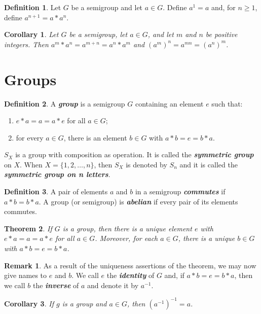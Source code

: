 \documentclass[12pt]{report}
\newtheorem{theorem}{Theorem}[chapter]
\newtheorem{corollary}[theorem]{Corollary}
\theoremstyle{definition}
\newtheorem*{definition}{Definition}
\newtheorem*{remark}{Remark}
\newcommand{\term}[1]{\textbf{\textit{#1}}}
\begin{document}
\begin{definition}
	Let $G$ be a semigroup and let $a\in G$. Define $a^1=a$ and, for $n\geq1$, define $a^{n+1}=a\ast a^n$.
\end{definition}

\begin{corollary}
	Let $G$ be a semigroup, let $a\in G$, and let $m$ and $n$ be positive integers. Then $a^m\ast a^n=a^{m+n}=a^n\ast a^m$ and $(a^m)^n=a^{mn}=(a^n)^m$.
\end{corollary}


\section{Groups}
\begin{definition}
	A \term{group} is a semigroup $G$ containing an element $e$ such that:
	\begin{enumerate}
		\item $e\ast a=a=a\ast e$ for all $a\in G$;
		\item for every $a\in G$, there is an element $b\in G$ with $a\ast b=e=b\ast a$.
	\end{enumerate}
	\par
	$S_X$ is a group with composition as operation. It is called the \term{symmetric group} on $X$. When $X=\{1, 2, \dots, n\}$,
	then $S_X$ is denoted by $S_n$ and it is called the \term{symmetric group on n letters}.
\end{definition}

\begin{definition}
	A pair of elements $a$ and $b$ in a semigroup \term{commutes} if $a\ast b=b\ast a$. A group (or semigroup) is \term{abelian} if every pair of its elements commutes.
\end{definition}

\begin{theorem}
	If $G$ is a group, then there is a unique element $e$ with $e\ast a=a=a\ast e$ for all $a\in G$.
	Moreover, for each $a\in G$, there is a unique $b\in G$ with $a\ast b=e=b\ast a$.
\end{theorem}

\begin{remark}
	As a result of the uniqueness assertions of the theorem, we may now give names to $e$ and $b$. We call $e$ the \term{identity} of $G$ and,
	if $a\ast b=e=b\ast a$, then we call $b$ the \term{inverse} of $a$ and denote it by $a^{-1}$.
\end{remark}

\begin{corollary}
	If $g$ is a group and $a\in G$, then $(a^{-1})^{-1}=a$.
\end{corollary}
\end{document}
